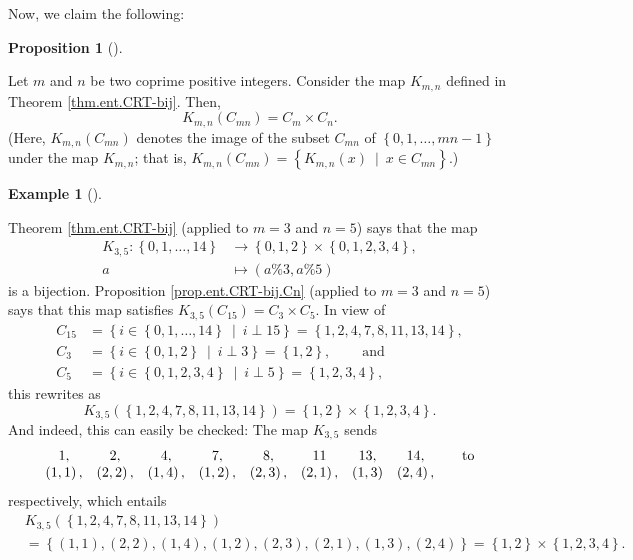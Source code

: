 \documentclass[numbers=enddot,12pt,final,onecolumn,notitlepage]{scrartcl}%
\numberwithin{exer}{subsection}
\theoremstyle{definition}
\newtheorem{prop}[theo]{Proposition}
\newenvironment{proposition}[1][]
{\begin{prop}[#1]\begin{leftbar}}
{\end{leftbar}\end{prop}}
\newtheorem{exam}[theo]{Example}
\newenvironment{example}[1][]
{\begin{exam}[#1]\begin{leftbar}}
{\end{leftbar}\end{exam}}
\begin{document}
Now, we claim the following:

\begin{proposition}
\label{prop.ent.CRT-bij.Cn}Let $m$ and $n$ be two coprime positive integers.
Consider the map $K_{m,n}$ defined in Theorem \ref{thm.ent.CRT-bij}. Then,%
\[
K_{m,n}\left(  C_{mn}\right)  =C_{m}\times C_{n}.
\]
(Here, $K_{m,n}\left(  C_{mn}\right)  $ denotes the image of the subset
$C_{mn}$ of $\left\{  0,1,\ldots,mn-1\right\}  $ under the map $K_{m,n}$; that
is, $K_{m,n}\left(  C_{mn}\right)  =\left\{  K_{m,n}\left(  x\right)
\ \mid\ x\in C_{mn}\right\}  $.)
\end{proposition}

\begin{example}
Theorem \ref{thm.ent.CRT-bij} (applied to $m=3$ and $n=5$) says that the map%
\begin{align*}
K_{3,5}:\left\{  0,1,\ldots,14\right\}   &  \rightarrow\left\{  0,1,2\right\}
\times\left\{  0,1,2,3,4\right\}  ,\\
a  &  \mapsto\left(  a\%3,a\%5\right)
\end{align*}
is a bijection. Proposition \ref{prop.ent.CRT-bij.Cn} (applied to $m=3$ and
$n=5$) says that this map satisfies $K_{3,5}\left(  C_{15}\right)
=C_{3}\times C_{5}$. In view of
\begin{align*}
C_{15}  &  =\left\{  i\in\left\{  0,1,\ldots,14\right\}  \ \mid\ i\perp
15\right\}  =\left\{  1,2,4,7,8,11,13,14\right\}  ,\\
C_{3}  &  =\left\{  i\in\left\{  0,1,2\right\}  \ \mid\ i\perp3\right\}
=\left\{  1,2\right\}  ,\ \ \ \ \ \ \ \ \ \ \text{and}\\
C_{5}  &  =\left\{  i\in\left\{  0,1,2,3,4\right\}  \ \mid\ i\perp5\right\}
=\left\{  1,2,3,4\right\}  ,
\end{align*}
this rewrites as%
\[
K_{3,5}\left(  \left\{  1,2,4,7,8,11,13,14\right\}  \right)  =\left\{
1,2\right\}  \times\left\{  1,2,3,4\right\}  .
\]
And indeed, this can easily be checked: The map $K_{3,5}$ sends%
\[%
\begin{array}
[c]{cccccccccc}%
1, & 2, & 4, & 7, & 8, & 11 & 13, & 14, &  & \text{to}\\
\left(  1,1\right)  , & \left(  2,2\right)  , & \left(  1,4\right)  , &
\left(  1,2\right)  , & \left(  2,3\right)  , & \left(  2,1\right)  , &
\left(  1,3\right)  & \left(  2,4\right)  , &  &
\end{array}
\]
respectively, which entails%
\begin{align*}
&  K_{3,5}\left(  \left\{  1,2,4,7,8,11,13,14\right\}  \right) \\
&  =\left\{  \left(  1,1\right)  ,\left(  2,2\right)  ,\left(  1,4\right)
,\left(  1,2\right)  ,\left(  2,3\right)  ,\left(  2,1\right)  ,\left(
1,3\right)  ,\left(  2,4\right)  \right\}  =\left\{  1,2\right\}
\times\left\{  1,2,3,4\right\}  .
\end{align*}

\end{example}
\end{document}
